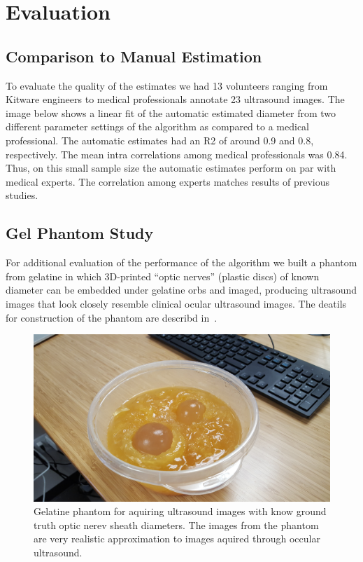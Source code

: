 \documentclass{llncs}
\begin{document}
\section{Evaluation}

\subsection{Comparison to Manual Estimation}
To evaluate the quality of the estimates we had 13 volunteers ranging from
Kitware engineers to medical professionals annotate 23 ultrasound images.  The
image below shows a linear fit of the automatic estimated diameter from two
different parameter settings of the algorithm as compared to a medical
professional. The automatic estimates had an R2 of around 0.9 and 0.8,
respectively. The mean intra correlations among medical professionals was 0.84.
Thus, on this small sample size the automatic estimates perform on par with
medical experts. The correlation among experts matches results of previous
studies.

\subsection{Gel Phantom Study}
For additional evaluation of the performance of the algorithm we built a
phantom from gelatine in which 3D-printed “optic nerves” (plastic discs) of
known diameter can be embedded under gelatine orbs and imaged, producing
ultrasound images that look closely resemble clinical ocular ultrasound images.
The deatils for construction of the phantom are describd in~\cite{Ze2014}.
\begin{figure}
\centering
\includegraphics[width=0.85\linewidth]{phantom.jpg} 
\caption{
\label{fig:phantom}
Gelatine phantom for aquiring ultrasound images with know ground truth optic
nerev sheath diameters. The images from the phantom are very realistic
approximation to images aquired through occular ultrasound. 
}
\end{figure}
\end{document}
